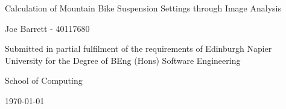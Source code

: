 \begin{titlepage}
	\begin{center}
		
		\vspace*{3cm}
		{\LARGE Calculation of Mountain Bike Suspension Settings through Image Analysis}
		
		\vspace{3cm}
		{\large Joe Barrett - 40117680}

		\vfill
		Submitted in partial fulfilment of the requirements of Edinburgh Napier University for the Degree of BEng (Hons) Software Engineering
		
		\vspace{1cm}
		School of Computing
		
		\vspace{1cm}
		\today
	\end{center}
\end{titlepage}